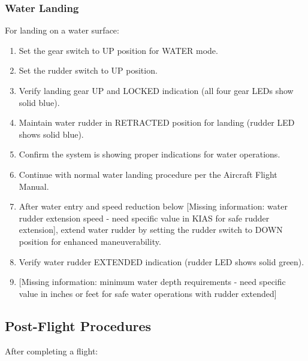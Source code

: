 \documentclass[12pt,a4paper,twoside,openright]{book}
\begin{document}
\subsubsection{Water Landing}
For landing on a water surface:

\begin{enumerate}
    \item Set the gear switch to UP position for WATER mode.
    \item Set the rudder switch to UP position.
    \item Verify landing gear UP and LOCKED indication (all four gear LEDs show solid blue).
    \item Maintain water rudder in RETRACTED position for landing (rudder LED shows solid blue).
    \item Confirm the system is showing proper indications for water operations.
    \item Continue with normal water landing procedure per the Aircraft Flight Manual.
    \item After water entry and speed reduction below {\color{red}[Missing information: water rudder extension speed - need specific value in KIAS for safe rudder extension]}, extend water rudder by setting the rudder switch to DOWN position for enhanced maneuverability.
    \item Verify water rudder EXTENDED indication (rudder LED shows solid green).
    \item {\color{red}[Missing information: minimum water depth requirements - need specific value in inches or feet for safe water operations with rudder extended]}
\end{enumerate}

\subsection{Post-Flight Procedures}

After completing a flight:
\end{document}
